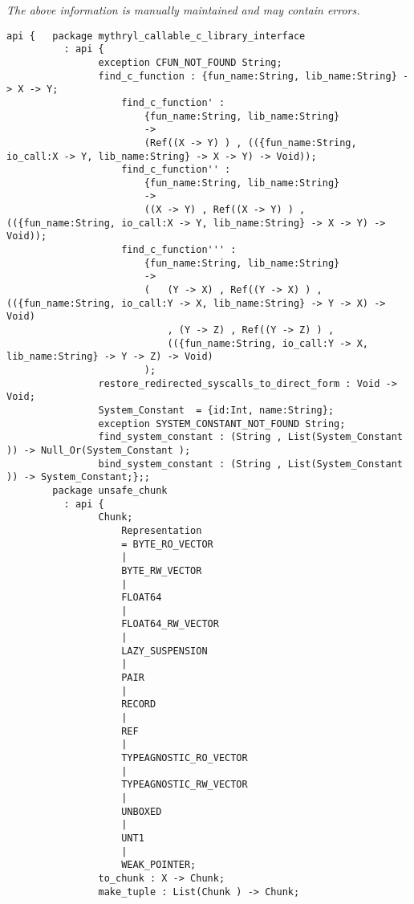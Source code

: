 \label{api:Unsafe}

{\tiny \it The above information is manually maintained and may contain errors.}
\begin{verbatim}
api {   package mythryl_callable_c_library_interface
          : api {
                exception CFUN_NOT_FOUND String;
                find_c_function : {fun_name:String, lib_name:String} -> X -> Y;
                    find_c_function' :
                        {fun_name:String, lib_name:String}
                        ->
                        (Ref((X -> Y) ) , (({fun_name:String, io_call:X -> Y, lib_name:String} -> X -> Y) -> Void));
                    find_c_function'' :
                        {fun_name:String, lib_name:String}
                        ->
                        ((X -> Y) , Ref((X -> Y) ) , (({fun_name:String, io_call:X -> Y, lib_name:String} -> X -> Y) -> Void));
                    find_c_function''' :
                        {fun_name:String, lib_name:String}
                        ->
                        (   (Y -> X) , Ref((Y -> X) ) , (({fun_name:String, io_call:Y -> X, lib_name:String} -> Y -> X) -> Void)
                            , (Y -> Z) , Ref((Y -> Z) ) ,
                            (({fun_name:String, io_call:Y -> X, lib_name:String} -> Y -> Z) -> Void)
                        );
                restore_redirected_syscalls_to_direct_form : Void -> Void;
                System_Constant  = {id:Int, name:String};
                exception SYSTEM_CONSTANT_NOT_FOUND String;
                find_system_constant : (String , List(System_Constant )) -> Null_Or(System_Constant );
                bind_system_constant : (String , List(System_Constant )) -> System_Constant;};;
        package unsafe_chunk
          : api {
                Chunk;
                    Representation
                    = BYTE_RO_VECTOR
                    |
                    BYTE_RW_VECTOR
                    |
                    FLOAT64
                    |
                    FLOAT64_RW_VECTOR
                    |
                    LAZY_SUSPENSION
                    |
                    PAIR
                    |
                    RECORD
                    |
                    REF
                    |
                    TYPEAGNOSTIC_RO_VECTOR
                    |
                    TYPEAGNOSTIC_RW_VECTOR
                    |
                    UNBOXED
                    |
                    UNT1
                    |
                    WEAK_POINTER;
                to_chunk : X -> Chunk;
                make_tuple : List(Chunk ) -> Chunk;

\end{verbatim}
